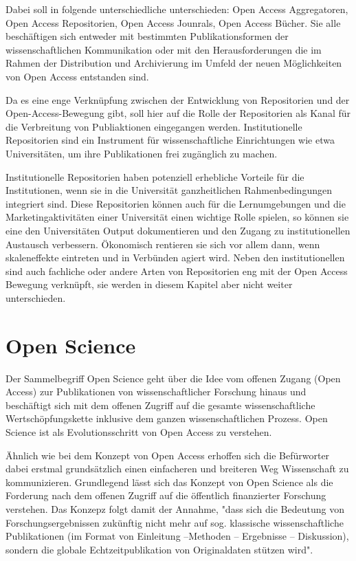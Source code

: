 Dabei soll in folgende unterschiedliche unterschieden: Open Access Aggregatoren, Open Access Repositorien, Open Access Jounrals, Open Access Bücher. Sie alle beschäftigen sich entweder mit bestimmten Publikationsformen der wissenschaftlichen Kommunikation oder mit den Herausforderungen die im Rahmen der Distribution und Archivierung im Umfeld der neuen Möglichkeiten von Open Access entstanden sind. 

Da es eine enge Verknüpfung zwischen der Entwicklung von Repositorien und der Open-Access-Bewegung gibt\cite{offhaus_2012_institutionelle_repos}, soll hier auf die Rolle der Repositorien als Kanal für die Verbreitung von Publiaktionen eingegangen werden. Institutionelle Repositorien sind ein Instrument für wissenschaftliche Einrichtungen wie etwa Universitäten, um ihre Publikationen frei zugänglich zu machen\cite{dobratz_2007_open}.

Institutionelle Repositorien haben potenziell erhebliche Vorteile für die Institutionen, wenn sie in die Universität ganzheitlichen Rahmenbedingungen integriert sind\cite{steele_2006}. Diese Repositorien können auch für die Lernumgebungen und die Marketingaktivitäten einer Universität einen wichtige Rolle spielen, so können sie eine den Universitäten Output dokumentieren und den Zugang zu institutionellen Austausch verbessern\cite{steele_2006}. Ökonomisch rentieren sie sich vor allem dann, wenn skaleneffekte eintreten und in Verbünden agiert wird.\cite{blythe_2005value} Neben den institutionellen sind auch fachliche oder andere Arten von Repositorien eng mit der Open Access Bewegung verknüpft, sie werden in diesem Kapitel aber nicht weiter unterschieden.

\section{Open Science}
Der Sammelbegriff Open Science geht über die Idee vom offenen Zugang (Open Access) zur Publikationen von wissenschaftlicher Forschung hinaus und beschäftigt sich mit dem offenen Zugriff auf die gesamte wissenschaftliche Wertschöpfungskette inklusive dem ganzen wissenschaftlichen Prozess. Open Science ist als Evolutionsschritt von Open Access zu verstehen. 

Ähnlich wie bei dem Konzept von Open Access erhoffen sich die Befürworter dabei erstmal grundsätzlich einen einfacheren und breiteren Weg Wissenschaft zu kommunizieren. Grundlegend lässt sich das Konzept von Open Science als die Forderung nach dem offenen Zugriff auf die öffentlich finanzierter Forschung verstehen. Das Konzepz folgt damit der Annahme, "dass sich die Bedeutung von Forschungsergebnissen zukünftig nicht mehr auf sog. klassische wissenschaftliche Publikationen (im Format von Einleitung –Methoden – Ergebnisse – Diskussion), sondern die globale Echtzeitpublikation von Originaldaten stützen wird"\cite{Stengel_2013}.

